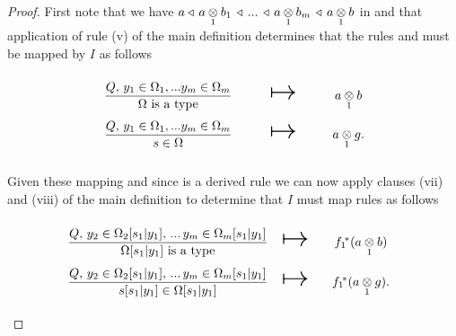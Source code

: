 {\begin{lemma}
\end{lemma}
\begin{proof}

\newcommand{\sonerule} {\gatdisplayrule{Q}         {\ofT{s_1}{\Omega_1}}}
\newcommand{\stworule}  {\gatdisplayrule{Q}       {\ofT{s_2}{\Omega_2[s_1|y_1]}}}
\newcommand{\weakenedOmegarule}{\gatdisplayrule{Q,\, \yOmega{m}} {\isT{\Omega}} }
\newcommand{\weakenedsrule}    {\gatdisplayrule{Q,\, \yOmega{m}} {\ofT{s}{\Omega}} }
\newcommand{\weakenedOmegaruleFirstsubstitution}{\gatdisplayrule{Q,\, \ofT{y_2}{\Omega_2[s_1|y_1]},\,...\,\ofT{y_m}{\Omega_m[s_1|y_1]}}{\isT{\Omega[s_1|y_1]}} }
\newcommand{\weakenedsruleFirstsubstitution}{\gatdisplayrule{Q,\, \ofT{y_2}{\Omega_2[s_1|y_1]},\,...\,\ofT{y_m}{\Omega_m[s_1|y_1]}}{\ofT{s[s_1|y_1]}{\Omega[s_1|y_1]}} }
\newcommand{\weakenedOmegaruleSecondsubstitution}{\gatdisplayrule{Q,\, \ofT{y_3}{\Omega_2[s_1|y_1, s_2|y_2]},\,...\,\ofT{y_m}{\Omega_m[s_1|y_1, s_2|y_2]}}{\isT{\Omega[s_1|y_1, s_2|y_2]}} }
\newcommand{\weakenedsruleSecondsubstitution}{\gatdisplayrule{Q,\, \ofT{y_2}{\Omega_2[s_1|y_1, s_2|y_2]},\,...\,\ofT{y_m}{\Omega_m[s_1|y_1, s_2|y_2]}}{\ofT{s[s_1|y_1, s_2|y_2]}{\Omega[s_1|y_1, s_2|y_2]}} }
First note that we have $a \base\, \crossx{a}{b_1}{1}\, \base\, ...\, \base\, \crossx{a}{b_m}{1}\, \base\, \crossx{a}{b}{1}$ in \catcw
and  that application of rule (v) of the main definition determines that the rules \weakenedOmegarule and \weakenedsrule must be mapped by $I$ as follows
\begin{equation*}
\begin{array}{c c c}
\forceSOURCEwidth & & \forceTARGETwidth \\ [-0.1cm]
\weakenedOmegarule  & \Imapsto & \crossx{a}{b}{1}   \\ [0.4cm]
\weakenedsrule      & \Imapsto & \crossx{a}{g}{1}.
\end{array}
\end{equation*}

Given these mapping and since  \sonerule is a derived rule we can now apply clauses (vii) and (viii) of the main definition
to determine that $I$ must map rules as follows
\begin{equation*}
\begin{array}{c c c}
\forceSOURCEwidth & & \forceTARGETwidth \\ [-0.1cm]
\weakenedOmegaruleFirstsubstitution  & \Imapsto & \fonestar(\crossx{a}{b}{1})   \\ [0.4cm]
\weakenedsruleFirstsubstitution      & \Imapsto & \fonestar(\crossx{a}{g}{1}).
\end{array}
\end{equation*}


\end{proof}}
